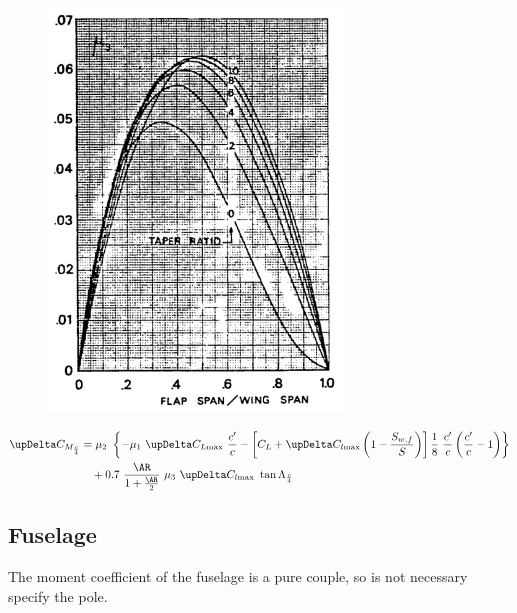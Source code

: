 \begin{figure}[H]
\begin{minipage}{.5\textwidth}
\includegraphics[width=0.94\linewidth]{Immagini/Mu3_Pitching_Moment}
\label{fig:Mu3}
\end{minipage}
\end{figure}
%
\begin{equation}
\begin{split}
\upDelta C_{M_{\frac{c}{4}}}&=\mu_2\ \left\{-\mu_1\ \upDelta C_{L\text{max}}\ \dfrac{c'}{c}-\left[C_L+\upDelta C_{l\text{max}}\left(1-\dfrac{S_{w,f}}{S}\right)\right]\dfrac{1}{8}\ \dfrac{c'}{c}\left(\dfrac{c'}{c}-1\right)\right\}\\
&\quad+0.7\ \dfrac{\AR}{1+\frac{\AR}{2}}\ \mu_3\ \upDelta C_{l\text{max}}\ \tan\Lambda_{\frac{c}{4}}
\label{eqn:DeltaCMPractical}
\end{split}
\end{equation}


\subsection{Fuselage}
The moment coefficient of the fuselage is a pure couple, so is not necessary specify the pole.


